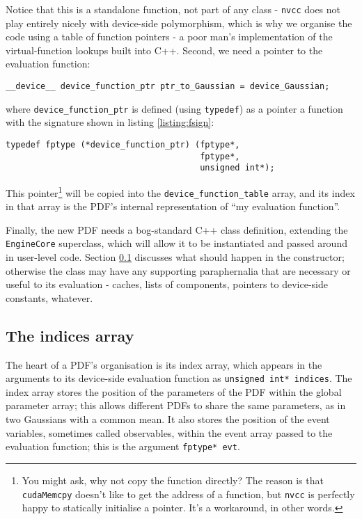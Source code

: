 \documentclass[12pt,pdflatex]{article}
\begin{document}
Notice that this is a standalone function, not part of any class - \texttt{nvcc}
does not play entirely nicely with device-side polymorphism, which is why we organise the
code using a table of function pointers - a poor man's implementation of the
virtual-function lookups built into C++. Second, we need a pointer to the 
evaluation function:
\begin{verbatim}
__device__ device_function_ptr ptr_to_Gaussian = device_Gaussian; 
\end{verbatim}
where \texttt{device\_function\_ptr} is defined (using \texttt{typedef}) as a pointer
a function with the signature shown in listing \ref{listing:fsign}:
\begin{verbatim}
typedef fptype (*device_function_ptr) (fptype*, 
                                       fptype*, 
                                       unsigned int*);
\end{verbatim}
This pointer\footnote{You might ask, why not copy the
function directly? The reason is that \texttt{cudaMemcpy} doesn't
like to get the address of a function, but \texttt{nvcc} is perfectly
happy to statically initialise a pointer. It's a workaround, in other
words.} 
will be copied into the \texttt{device\_function\_table} array,
and its index in that array is the PDF's internal representation of ``my evaluation
function''. 

Finally, the new PDF needs a bog-standard C++ class definition, extending
the \texttt{EngineCore} superclass, which will allow it to be instantiated
and passed around in user-level code. Section \ref{subsec:indexarray} discusses
what should happen in the constructor; otherwise the class may have any supporting
paraphernalia that are necessary or useful to its evaluation - caches, 
lists of components, pointers to device-side constants, whatever. 

\subsection{The indices array}
\label{subsec:indexarray}

The heart of a PDF's organisation is its index array, which 
appears in the arguments to its device-side evaluation function
as \verb|unsigned int* indices|. The index array stores the position
of the parameters of the PDF within the global parameter array;
this allows different PDFs to share the same parameters, as in two
Gaussians with a common mean. It also stores the position of the
event variables, sometimes called observables, within the event array
passed to the evaluation function; this is the argument \verb|fptype* evt|.
\end{document}
